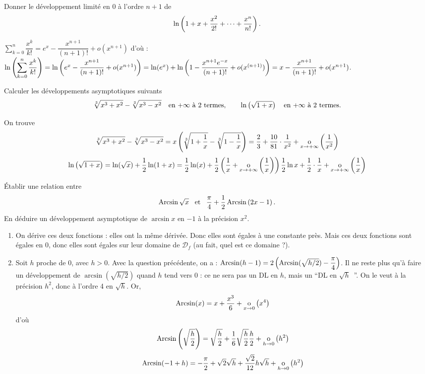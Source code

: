 \documentclass{magnolia}
\begin{document}
Donner le développement limité en 0 à l'ordre $n+1$ de
\[\ln\left(1+x+\frac{x^2}{2!}+\dots+\frac{x^n}{n!}\right).\]

\begin{sol}
$\displaystyle \sum_{k=0}^{n}\dfrac{x^k}{k!}=e^x-\dfrac{x^{n+1}}{(n+1)!}+o(x^{n+1})$ d'où :\\$\ln\left(
\displaystyle \sum_{k=0}^{n}\dfrac{x^k}{k!}\right)=\ln\left(e^x-\dfrac{x^{n+1}}{(n+1)!}+o(x^{n+1})\right)=\ln(e^x)+\ln\left(1-\dfrac{x^{n+1}e^{-x}}
{ (n+1)! }+o(x^{(n+1)})\right)=x-\dfrac{x^{n+1}}{(n+1)!}+o(x^{n+1})$.
\end{sol}

Calculer les développements asymptotiques suivants
\[\sqrt[3]{x^3+x^2}-\sqrt[3]{x^3-x^2} \quad\text{en $+\infty$ à 2 termes},
  \qquad \ln\left(\sqrt{1+x}\right) \quad\text{en $+\infty$ à 2 termes}.\]
\begin{sol}
On trouve
\[\sqrt[3]{x^3+x^2}-\sqrt[3]{x^3-x^2}=x\left(\sqrt[3]{1+\frac1x}-\sqrt[3]{1-\frac1x}\right)=\frac{2}{3}+\frac{10}{81}\cdot\frac{1}{x^2}
  +\underset{x \rightarrow +\infty}{\text{o}}\left(\frac{1}{x^2}\right)\]
\[\ln\left(\sqrt{1+x}\right)=\ln(\sqrt{x})+\frac{1}{2}\ln(1+x)=\frac{1}{2}\ln(x)+\frac{1}{2}\left(\frac{1}{x}+\underset{x \rightarrow +\infty}{\text{o}}\left(\frac{1}{x}\right)\right)\frac{1}{2}\ln x+\frac{1}{2}\cdot\frac{1}{x}
  +\underset{x \rightarrow +\infty}{\text{o}}\left(\frac{1}{x}\right)\]
\end{sol}


\begin{questions}
\question Établir une relation entre
  $$\operatorname{Arcsin}\sqrt{x} \quad\!\text{et}\quad\! \frac{\pi}{4}+\frac{1}{2}\operatorname{Arcsin}\left(2x-1\right).$$
\question En déduire un développement asymptotique de $\arcsin x$ en $-1$
  à la précision $x^2$.
\end{questions}
\begin{sol}
\begin{enumerate}
\item On dérive ces deux fonctions : elles ont la même dérivée. Donc elles sont égales à une constante près. Mais ces deux fonctions sont égales en 0, donc elles sont égales sur leur domaine de $\mathcal{D}_f$ (au fait, quel est ce domaine ?).
\item Soit $h$ proche de 0, avec $h>0$. Avec la question précédente, on a : $\operatorname{Arcsin}(h-1)=2\left(\operatorname{Arcsin}(\sqrt{h/2})-\dfrac\pi4\right)$. Il ne reste plus qu'à faire un développement de $\arcsin(\sqrt{h/2})$ quand $h$ tend vers 0 : ce ne sera pas un DL en $h$, mais un ``DL en $\sqrt h$\ ''. On le veut à la précision $h^2$, donc à l'ordre 4 en $\sqrt h$.
Or, $$\operatorname{Arcsin}(x)=x+\frac{x^3}{6}+\underset{x \rightarrow 0}{\text{o}}\left(x^4\right)$$ d'où $$\operatorname{Arcsin}\left(\sqrt{\frac{h}{2}}\right)=\sqrt{\frac{h}{2}}+\frac{1}{6}\sqrt{\frac{h}{2}}\frac{h}{2}+\underset{h \rightarrow 0}{\text{o}}\left(h^2\right)$$
\[\operatorname{Arcsin}(-1+h)=-\frac{\pi}{2}+\sqrt{2}\sqrt{h}+\frac{\sqrt{2}}{12}h\sqrt{h}+
  \underset{h \rightarrow 0}{\text{o}}\left(h^2\right)\]
\end{enumerate}

\end{sol}
\end{document}
